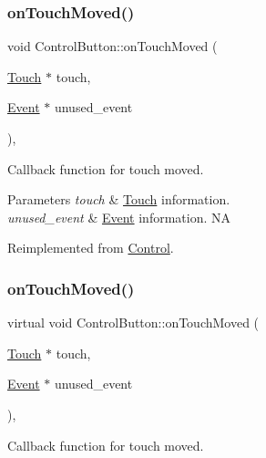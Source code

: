 \subsubsection{\texorpdfstring{on\+Touch\+Moved()}{onTouchMoved()}\hspace{0.1cm}{\footnotesize\ttfamily [1/2]}}
{\footnotesize\ttfamily void Control\+Button\+::on\+Touch\+Moved (\begin{DoxyParamCaption}\item[{\hyperlink{classTouch}{Touch} $\ast$}]{touch,  }\item[{\hyperlink{classEvent}{Event} $\ast$}]{unused\+\_\+event }\end{DoxyParamCaption})\hspace{0.3cm}{\ttfamily [override]}, {\ttfamily [virtual]}}

Callback function for touch moved.


\begin{DoxyParams}{Parameters}
{\em touch} & \hyperlink{classTouch}{Touch} information. \\
\hline
{\em unused\+\_\+event} & \hyperlink{classEvent}{Event} information.  NA \\
\hline
\end{DoxyParams}


Reimplemented from \hyperlink{classControl_a26d2e6af053319dc605949678f726622}{Control}.

\mbox{\label{classControlButton_a8c8a5c24adf67ec671fbc113889f0870}} 
\subsubsection{\texorpdfstring{on\+Touch\+Moved()}{onTouchMoved()}\hspace{0.1cm}{\footnotesize\ttfamily [2/2]}}
{\footnotesize\ttfamily virtual void Control\+Button\+::on\+Touch\+Moved (\begin{DoxyParamCaption}\item[{\hyperlink{classTouch}{Touch} $\ast$}]{touch,  }\item[{\hyperlink{classEvent}{Event} $\ast$}]{unused\+\_\+event }\end{DoxyParamCaption})\hspace{0.3cm}{\ttfamily [override]}, {\ttfamily [virtual]}}

Callback function for touch moved.


